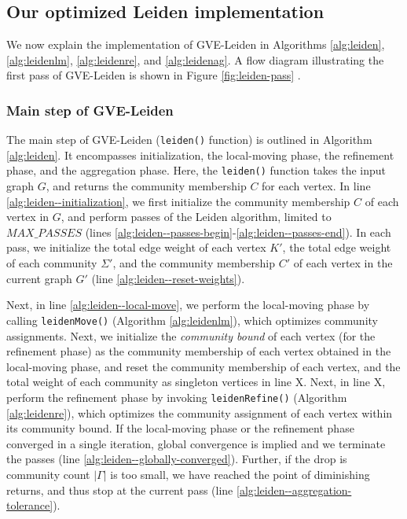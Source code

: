 



\subsection{Our optimized Leiden implementation}

We now explain the implementation of GVE-Leiden in Algorithms \ref{alg:leiden}, \ref{alg:leidenlm}, \ref{alg:leidenre}, and \ref{alg:leidenag}. A flow diagram illustrating the first pass of GVE-Leiden is shown in Figure \ref{fig:leiden-pass} .


\subsubsection{Main step of GVE-Leiden}

The main step of GVE-Leiden (\texttt{leiden()} function) is outlined in Algorithm \ref{alg:leiden}. It encompasses initialization, the local-moving phase, the refinement phase, and the aggregation phase. Here, the \texttt{leiden()} function takes the input graph $G$, and returns the community membership $C$ for each vertex. In line \ref{alg:leiden--initialization}, we first initialize the community membership $C$ of each vertex in $G$, and perform passes of the Leiden algorithm, limited to $MAX\_PASSES$ (lines \ref{alg:leiden--passes-begin}-\ref{alg:leiden--passes-end}). In each pass, we initialize the total edge weight of each vertex $K'$, the total edge weight of each community $\Sigma'$, and the community membership $C'$ of each vertex in the current graph $G'$ (line \ref{alg:leiden--reset-weights}).

Next, in line \ref{alg:leiden--local-move}, we perform the local-moving phase by calling \texttt{leidenMove()} (Algorithm \ref{alg:leidenlm}), which optimizes community assignments. Next, we initialize the \textit{community bound} of each vertex (for the refinement phase) as the community membership of each vertex obtained in the local-moving phase, and reset the community membership of each vertex, and the total weight of each community as singleton vertices in line X. Next, in line X, perform the refinement phase by invoking \texttt{leidenRefine()} (Algorithm \ref{alg:leidenre}), which optimizes the community assignment of each vertex within its community bound. If the local-moving phase or the refinement phase converged in a single iteration, global convergence is implied and we terminate the passes (line \ref{alg:leiden--globally-converged}). Further, if the drop is community count $|\Gamma|$ is too small, we have reached the point of diminishing returns, and thus stop at the current pass (line \ref{alg:leiden--aggregation-tolerance}).

